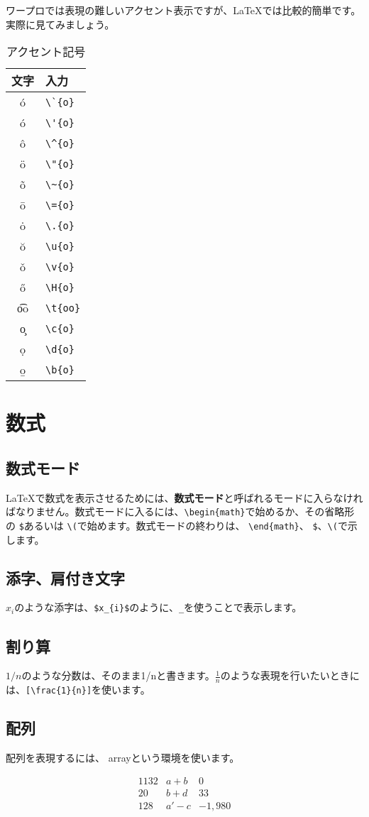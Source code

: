 \documentclass{jsbook}
\begin{document}
ワープロでは表現の難しいアクセント表示ですが、\LaTeX では比較的簡単です。実際に見てみましょう。

\begin{table}[htbp]
  \begin{tabular}[htbp]{|c|l|}\hline
    文字&入力\\ \hline
    \'{o}&\verb+\`{o}+\\
    \'{o}&\verb+\'{o}+\\
    \^{o}&\verb+\^{o}+\\
    \"{o}&\verb+\"{o}+\\
    \~{o}&\verb+\~{o}+\\
    \={o}&\verb+\={o}+\\
    \.{o}&\verb+\.{o}+\\
    \u{o}&\verb+\u{o}+\\
    \v{o}&\verb+\v{o}+\\
    \H{o}&\verb+\H{o}+\\
    \t{oo}&\verb+\t{oo}+\\
    \c{o}&\verb+\c{o}+\\
    \d{o}&\verb+\d{o}+\\
    \b{o}&\verb+\b{o}+\\ \hline
  \end{tabular}
  \caption{アクセント記号}
  \label{tab:accent}
\end{table}

\section{数式}
\label{sec:equation}

\subsection{数式モード}
\label{sec:mathmode}

\LaTeX で数式を表示させるためには、\textbf{数式モード}と呼ばれるモードに入らなければなりません。数式モードに入るには、\verb+\begin{math}+で始めるか、その省略形の \verb+$+あるいは \verb+\(+で始めます。数式モードの終わりは、 \verb+\end{math}+、 \verb+$+、\verb+\(+で示します。

\subsection{添字、肩付き文字}
\label{sec:script}

$x_{i}$のような添字は、\verb+$x_{i}$+のように、\verb+_+を使うことで表示します。

\subsection{割り算}
\label{sec:divert}

$1/n$のような分数は、そのまま1/nと書きます。$\frac{1}{n}$のような表現を行いたいときには、\verb+[\frac{1}{n}]+を使います。

\subsection{配列}
\label{sec:array}

配列を表現するには、 arrayという環境を使います。 

\[
\begin{array}{clr}
1132 & a+b & 0 \\
20   & b+d & 33 \\
128  & a'-c & -1,980
\end{array}
\]
\end{document}
